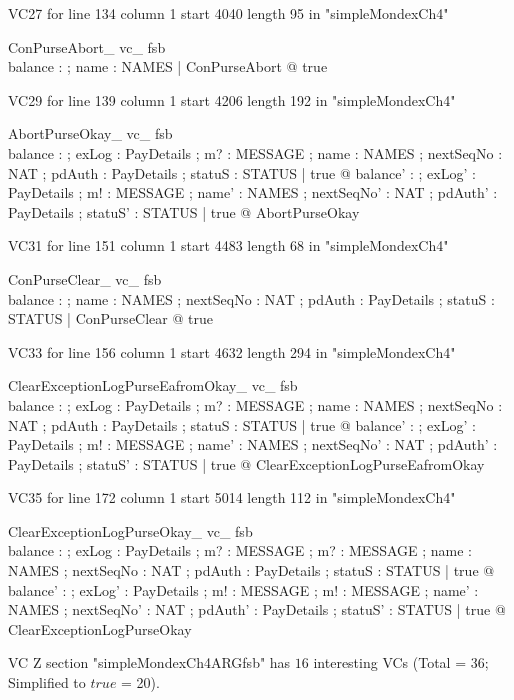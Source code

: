 \documentclass{article}
\begin{document}
VC27 for line 134 column 1 start 4040 length 95 in "simpleMondexCh4"
\begin{theorem}{ ConPurseAbort\_ vc\_ fsb}\\
 \exists balance : \nat ; name : NAMES | ConPurseAbort @ true \\

\end{theorem}

VC29 for line 139 column 1 start 4206 length 192 in "simpleMondexCh4"
\begin{theorem}{ AbortPurseOkay\_ vc\_ fsb}\\
 \forall balance : \nat ; exLog : \power PayDetails ; m? : MESSAGE ; name : NAMES ; nextSeqNo : NAT ; pdAuth : PayDetails ; statuS : STATUS | true @ \exists balance' : \nat ; exLog' : \power PayDetails ; m! : MESSAGE ; name' : NAMES ; nextSeqNo' : NAT ; pdAuth' : PayDetails ; statuS' : STATUS | true @ AbortPurseOkay \\

\end{theorem}

VC31 for line 151 column 1 start 4483 length 68 in "simpleMondexCh4"
\begin{theorem}{ ConPurseClear\_ vc\_ fsb}\\
 \exists balance : \nat ; name : NAMES ; nextSeqNo : NAT ; pdAuth : PayDetails ; statuS : STATUS | ConPurseClear @ true \\

\end{theorem}

VC33 for line 156 column 1 start 4632 length 294 in "simpleMondexCh4"
\begin{theorem}{ ClearExceptionLogPurseEafromOkay\_ vc\_ fsb}\\
 \forall balance : \nat ; exLog : \power PayDetails ; m? : MESSAGE ; name : NAMES ; nextSeqNo : NAT ; pdAuth : PayDetails ; statuS : STATUS | true @ \exists balance' : \nat ; exLog' : \power PayDetails ; m! : MESSAGE ; name' : NAMES ; nextSeqNo' : NAT ; pdAuth' : PayDetails ; statuS' : STATUS | true @ ClearExceptionLogPurseEafromOkay \\

\end{theorem}

VC35 for line 172 column 1 start 5014 length 112 in "simpleMondexCh4"
\begin{theorem}{ ClearExceptionLogPurseOkay\_ vc\_ fsb}\\
 \forall balance : \nat ; exLog : \power PayDetails ; m? : MESSAGE ; m? : MESSAGE ; name : NAMES ; nextSeqNo : NAT ; pdAuth : PayDetails ; statuS : STATUS | true @ \exists balance' : \nat ; exLog' : \power PayDetails ; m! : MESSAGE ; m! : MESSAGE ; name' : NAMES ; nextSeqNo' : NAT ; pdAuth' : PayDetails ; statuS' : STATUS | true @ ClearExceptionLogPurseOkay \\

\end{theorem}



 VC Z section "simpleMondexCh4ARGfsb" has $16$ interesting VCs (Total = 36; Simplified to $true$ = 20).



\end{document}

